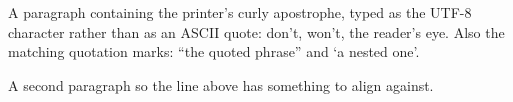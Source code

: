 \documentclass{article}
\begin{document}
A paragraph containing the printer’s curly apostrophe, typed as the UTF-8
character rather than as an ASCII quote: don’t, won’t, the reader’s eye.
Also the matching quotation marks: “the quoted phrase” and ‘a nested one’.

A second paragraph so the line above has something to align against.
\end{document}
